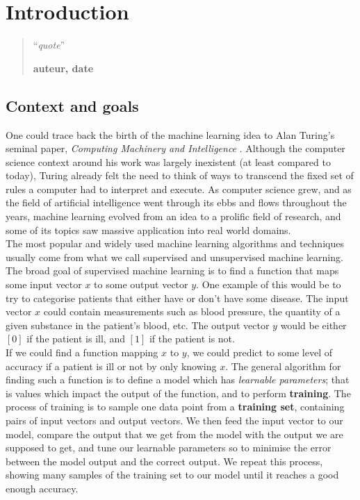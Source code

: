 \chapter{Introduction}
\setcounter{page}{1}
\begin{quotation}
\noindent ``\emph{quote}''
\begin{flushright}\textbf{auteur, date}\end{flushright}
\end{quotation}

\vspace*{0.5cm}

\section{Context and goals}
One could trace back the birth of the machine learning idea to Alan Turing's 
seminal paper, \textit{Computing Machinery and Intelligence} 
\cite{turing1950computing}. Although the computer science context around his
work was largely inexistent (at least compared to today), Turing already felt
the need to think of ways to transcend the fixed set of rules a computer had
to interpret and execute. As computer science grew, and as the field of
artificial intelligence went through its ebbs and flows throughout the years,
machine learning evolved from an idea to a prolific field of research, and
some of its topics saw massive application into real world domains.\\

The most popular and widely used machine learning algorithms and techniques
usually come from what we call supervised and unsupervised machine learning.
The broad goal of supervised machine learning is to find a function that maps
some input vector $x$ to some output vector $y$. One example of this would be
to try to categorise patients that either have or don't have some disease. 
The input vector $x$ could contain measurements such as blood pressure, the 
quantity of a given substance in the patient's blood, etc. The output vector
$y$ would be either $[0]$ if the patient is ill, and $[1]$ if the patient is
not.\\

If we could find a function mapping $x$ to $y$, we could predict to some
level of accuracy if a patient is ill or not by only knowing $x$. The general
algorithm for finding such a function is to define a model which has
\textit{learnable parameters}; that is values which impact the output of the
function, and to perform \textbf{training}. The process of training is to
sample one data point from a \textbf{training set}, containing pairs of input
vectors and output vectors. We then feed the input vector to our model, compare
the output that we get from the model with the output we are supposed to get,
and tune our learnable parameters so to minimise the error between the model
output and the correct output. We repeat this process, showing many samples
of the training set to our model until it reaches a good enough accuracy.

